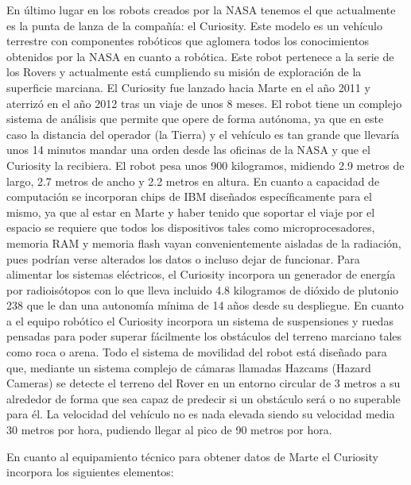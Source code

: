 En último lugar en los robots creados por la NASA tenemos el que actualmente es la punta de lanza de la compañía: el Curiosity. Este modelo es un vehículo terrestre con componentes robóticos que aglomera todos los conocimientos obtenidos por la NASA en cuanto a robótica. Este robot pertenece a la serie de los Rovers y actualmente está cumpliendo su misión de exploración de la superficie marciana. El Curiosity fue lanzado hacia Marte en el año 2011 y aterrizó en el año 2012 tras un viaje de unos 8 meses. El robot tiene un complejo sistema de análisis que permite que opere de forma autónoma, ya que en este caso la distancia del operador (la Tierra) y el vehículo es tan grande que llevaría unos 14 minutos mandar una orden desde las oficinas de la NASA y que el Curiosity la recibiera. El robot pesa unos 900 kilogramos, midiendo 2.9 metros de largo, 2.7 metros de ancho y 2.2 metros en altura. En cuanto a capacidad de computación se incorporan chips de IBM diseñados específicamente para el mismo, ya que al estar en Marte y haber tenido que soportar el viaje por el espacio se requiere que todos los dispositivos tales como microprocesadores, memoria RAM y memoria flash vayan convenientemente aisladas de la radiación, pues podrían verse alterados los datos o incluso dejar de funcionar. Para alimentar los sistemas eléctricos, el Curiosity incorpora un generador de energía por radioisótopos con lo que lleva incluido 4.8 kilogramos de dióxido de plutonio 238 que le dan una autonomía mínima de 14 años desde su despliegue. En cuanto a el equipo robótico el Curiosity incorpora un sistema de suspensiones y ruedas pensadas para poder superar fácilmente los obstáculos del terreno marciano tales como roca o arena. Todo el sistema de movilidad del robot está diseñado para que, mediante un sistema complejo de cámaras llamadas Hazcams (Hazard Cameras) se detecte el terreno del Rover en un entorno circular de 3 metros a su alrededor de forma que sea capaz de predecir si un obstáculo será o no superable para él. La velocidad del vehículo no es nada elevada siendo su velocidad media 30 metros por hora, pudiendo llegar al pico de 90 metros por hora.

En cuanto al equipamiento técnico para obtener datos de Marte el Curiosity incorpora los siguientes elementos:

